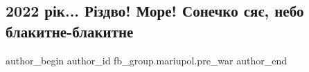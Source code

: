  
 
 
 
 

\subsection{2022 рік... Різдво!  Море! Сонечко сяє, небо блакитне-блакитне}
\label{sec:18_02_2023.fb.fb_group.mariupol.pre_war.3.2022_r_k__r_zdvo___m}

\ifcmt
 author_begin
   author_id fb_group.mariupol.pre_war
 author_end
\fi
